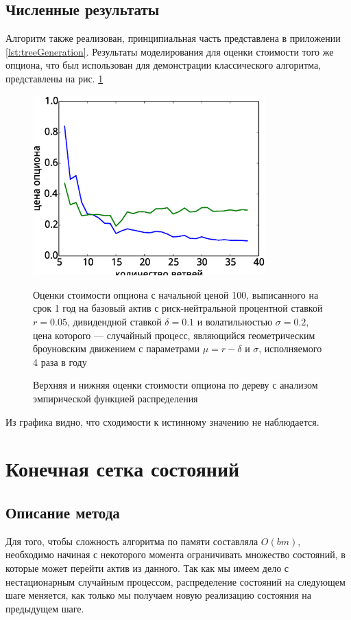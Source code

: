 \documentclass[specialist,
               substylefile = spbu.rtx,
               subf,href,colorlinks=true, 12pt]{disser}
\begin{document}
		\subsection{Численные результаты}
		Алгоритм также реализован, принципиальная часть представлена в приложении \ref{lst:treeGeneration}. Результаты моделирования для оценки стоимости того же опциона, что был использован для демонстрации классического алгоритма, представлены на рис. \ref{fig:true_value_test_empiric_distr}
		\begin{figure}[h]
    	    \centering
    		\includegraphics[width=0.8\textwidth]{true_value_test_empiric_distr}
    		\caption{Верхняя и нижняя оценки стоимости опциона по дереву с анализом эмпирической функцией распределения}
    		\label{fig:true_value_test_empiric_distr}
    		\footnotesize{Оценки стоимости опциона с начальной ценой 100, выписанного на срок 1 год на базовый актив с риск-нейтральной процентной ставкой $r = 0.05$, дивидендной ставкой $\delta = 0.1$ и волатильностью $\sigma=0.2$, цена которого --- случайный процесс, являющийся геометрическим броуновским движением с параметрами $\mu = r - \delta$ и $\sigma$, исполняемого 4 раза в году}
	    \end{figure}
		Из графика видно, что сходимости к истинному значению не наблюдается.
	\section{Конечная сетка состояний}
	    \subsection{Описание метода}
	        Для того, чтобы сложность алгоритма по  памяти составляла $O(bm)$, необходимо начиная с некоторого момента ограничивать множество состояний, в которые может перейти актив из данного. Так как мы имеем дело с нестационарным случайным процессом, распределение состояний на следующем шаге меняется, как только мы получаем новую реализацию состояния на предыдущем шаге.
\end{document}
